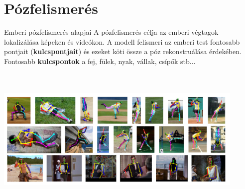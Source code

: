 \documentclass[english, aspectratio=169]{beamer}
\makeatletter
\let\origtableofcontents=\tableofcontents
\def\tableofcontents{\@ifnextchar[{\origtableofcontents}{\gobbletableofcontents}}
\def\gobbletableofcontents#1{\origtableofcontents}
\makeatother
\begin{document}
\section{Pózfelismerés}

\begin{frame}
\tableofcontents[currentsection]
\end{frame}

\begin{frame}{Emberi pózfelismerés alapjai}
A pózfelismerés célja az emberi végtagok lokalizálása képeken és videókon. A modell felismeri az emberi test fontosabb pontjait (\textbf{kulcspontjait}) és ezeket köti össze a póz rekonstruálása érdekében. Fontosabb \textbf{kulcspontok} a fej, fülek, nyak, vállak, csípők stb...
\begin{center}
\includegraphics[height=7cm, width=12cm, keepaspectratio]{images/instance_22.png}
\end{center}
\end{frame}
\end{document}
